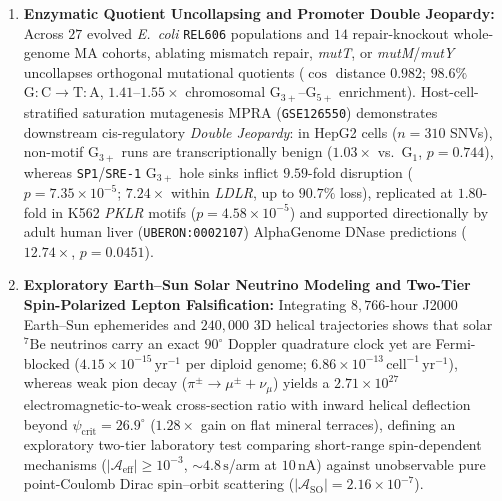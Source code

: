 \documentclass[11pt,letterpaper]{article}
\begin{document}
\begin{enumerate}[leftmargin=1.6em,itemsep=2pt,topsep=2pt]
    \item \textbf{Enzymatic Quotient Uncollapsing and Promoter Double Jeopardy:} Across $27$ evolved \emph{E.\ coli} \texttt{REL606} populations and $14$ repair-knockout whole-genome MA cohorts, ablating mismatch repair, \emph{mutT}, or \emph{mutM}/\emph{mutY} uncollapses orthogonal mutational quotients ($\cos$ distance $0.982$; $98.6\%$ $\mathrm{G{:}C \to T{:}A}$, $1.41$--$1.55\times$ chromosomal $\mathrm{G}_{3+}$--$\mathrm{G}_{5+}$ enrichment). Host-cell-stratified saturation mutagenesis MPRA (\texttt{GSE126550}) demonstrates downstream cis-regulatory \emph{Double Jeopardy}: in HepG2 cells ($n=310$ SNVs), non-motif $\mathrm{G}_{3+}$ runs are transcriptionally benign ($1.03\times$ vs.\ $\mathrm{G}_1$, $p = 0.744$), whereas \texttt{SP1}/\texttt{SRE-1} $\mathrm{G}_{3+}$ hole sinks inflict $9.59$-fold disruption ($p = 7.35 \times 10^{-5}$; $7.24\times$ within \emph{LDLR}, up to $90.7\%$ loss), replicated at $1.80$-fold in K562 \emph{PKLR} motifs ($p = 4.58 \times 10^{-5}$) and supported directionally by adult human liver (\texttt{UBERON:0002107}) AlphaGenome DNase predictions ($12.74\times$, $p = 0.0451$).
    \item \textbf{Exploratory Earth--Sun Solar Neutrino Modeling and Two-Tier Spin-Polarized Lepton Falsification:} Integrating $8{,}766$-hour J2000 Earth--Sun ephemerides and $240{,}000$ 3D helical trajectories shows that solar $^7\mathrm{Be}$ neutrinos carry an exact $90^\circ$ Doppler quadrature clock yet are Fermi-blocked ($4.15 \times 10^{-15}\,\mathrm{yr^{-1}}$ per diploid genome; $6.86 \times 10^{-13}\,\mathrm{cell^{-1}\,yr^{-1}}$), whereas weak pion decay ($\pi^\pm \to \mu^\pm + \nu_\mu$) yields a $2.71 \times 10^{27}$ electromagnetic-to-weak cross-section ratio with inward helical deflection beyond $\psi_{\mathrm{crit}} = 26.9^\circ$ ($1.28\times$ gain on flat mineral terraces), defining an exploratory two-tier laboratory test comparing short-range spin-dependent mechanisms ($|\mathcal{A}_{\mathrm{eff}}| \ge 10^{-3}$, $\sim 4.8\,\mathrm{s}$/arm at $10\,\mathrm{nA}$) against unobservable pure point-Coulomb Dirac spin--orbit scattering ($|\mathcal{A}_{\mathrm{SO}}| = 2.16 \times 10^{-7}$).
\end{enumerate}
\end{document}

